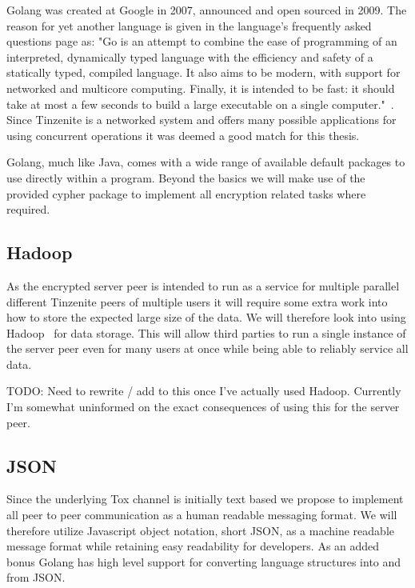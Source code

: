 Golang was created at Google in 2007, announced and open sourced in 2009.
The reason for yet another language is given in the language's frequently asked questions page as: "Go is an attempt to combine the ease of programming of an interpreted, dynamically typed language with the efficiency and safety of a statically typed, compiled language. It also aims to be modern, with support for networked and multicore computing. Finally, it is intended to be fast: it should take at most a few seconds to build a large executable on a single computer."~\cite{web:site:golang:faq}.
Since Tinzenite is a networked system and offers many possible applications for using concurrent operations it was deemed a good match for this thesis.

Golang, much like Java, comes with a wide range of available default packages to use directly within a program.
Beyond the basics we will make use of the provided cypher package to implement all encryption related tasks where required.

\subsection{Hadoop}

As the encrypted server peer is intended to run as a service for multiple parallel different Tinzenite peers of multiple users it will require some extra work into how to store the expected large size of the data.
We will therefore look into using Hadoop~\cite{web:site:hadoop} for data storage.
This will allow third parties to run a single instance of the server peer even for many users at once while being able to reliably service all data.

TODO: Need to rewrite / add to this once I've actually used Hadoop.
Currently I'm somewhat uninformed on the exact consequences of using this for the server peer.

\subsection{JSON}

Since the underlying Tox channel is initially text based we propose to implement all peer to peer communication as a human readable messaging format.
We will therefore utilize Javascript object notation, short JSON, as a machine readable message format while retaining easy readability for developers.
As an added bonus Golang has high level support for converting language structures into and from JSON.


